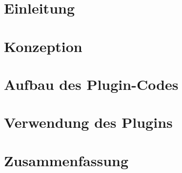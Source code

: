 \chapter{Einleitung}
	
	
\chapter{Konzeption}
	
	
\chapter{Aufbau des Plugin-Codes}
	
	
\chapter{Verwendung des Plugins}
	

\chapter{Zusammenfassung}
	
